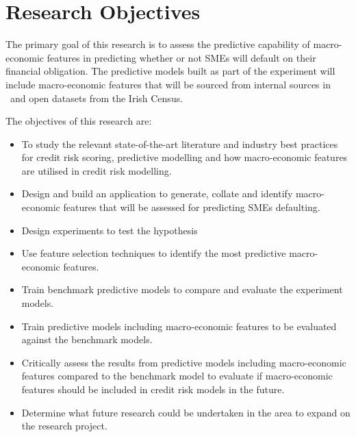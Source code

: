 \section{Research Objectives}
The primary goal of this research is to assess the predictive capability of macro-economic features in predicting whether or not SMEs will default on their financial obligation. The predictive models built as part of the experiment will include macro-economic features that will be sourced from internal sources in \subjectname\ and open datasets from the Irish Census.

 
The objectives of this research are:
\begin{itemize}
	\item To study the relevant state-of-the-art literature and industry best practices for credit risk scoring, predictive modelling and how macro-economic features are utilised in credit risk modelling.
	
	\item Design and build an application to generate, collate and identify macro-economic features that will be assessed for predicting SMEs defaulting.
	
	\item Design experiments to test the hypothesis
	
	\item Use feature selection techniques to identify the most predictive  macro-economic features.
	
	\item Train benchmark predictive models to compare and evaluate the experiment models.
	
	\item Train predictive models including macro-economic features to be evaluated against the benchmark models.

	\item Critically assess the results from predictive models including macro-economic features compared to the benchmark model to evaluate if macro-economic features should be included in credit risk models in the future.

	\item Determine what future research could be undertaken in the area to expand on the research project.
\end{itemize}
	

